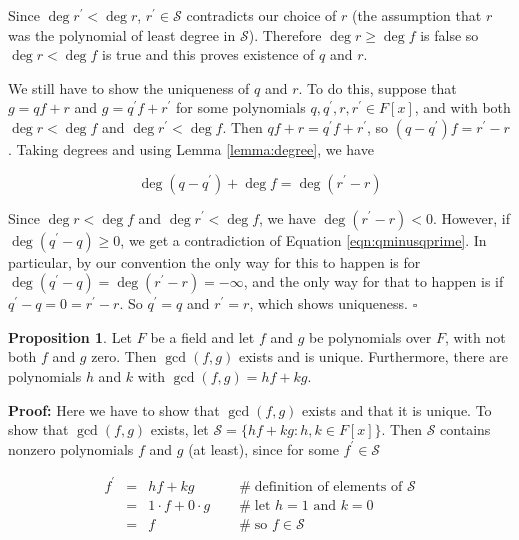 \documentclass[11pt, oneside]{article}   	%
\theoremstyle{definition}
\newtheorem{proposition}{Proposition}[section]
\begin{document}
\bigskip
\noindent
Since $\deg r^\prime < \deg r$,   $r^\prime \in \mathcal{S} $ contradicts our choice of $r$ (the assumption that $r$ was the polynomial of least degree
in $\mathcal{S}$).  Therefore $\deg r \geq \deg f$ is false so $\deg r  < \deg f$ is true and this proves existence of $q$ and $r$.

\bigskip
\noindent
We still have to show the uniqueness of $q$ and $r$. To do this, suppose that $g = qf +r$ and $g = q^{\prime} f + r^\prime$ for some polynomials 
$q,q^\prime, r,r^\prime \in F[x]$, and with both $\deg r < \deg f$ and $\deg r^\prime <  \deg f$. Then $qf +r = q^{\prime} f +r^{\prime}$, so 
$(q -  q^{\prime})f = r^\prime - r$. Taking degrees and using Lemma \ref{lemma:degree}, we have 

\begin{equation}
\deg (q - q^{\prime}) + \deg f  = \deg (r^\prime - r)
\label{eqn:qminusqprime}
\end{equation}

\bigskip
\noindent
Since $\deg r <  \deg f$ and $\deg r^\prime <  \deg f$, we have $\deg (r^\prime - r) < 0$. However, if $\deg(q^\prime - q) \geq 0$,  
we get a contradiction of Equation \ref{eqn:qminusqprime}. In particular, by our convention the only way for this to happen is for 
$\deg(q^\prime - q) = \deg(r^\prime - r) = - \infty$, and the only way for that to happen is if $q^\prime - q = 0 = r^\prime - r$. So $q^\prime = q$ and  
$r^\prime =r$, which shows uniqueness. $\square$

\bigskip
\begin{proposition}
Let $F$ be a field and let $f$ and $g$ be polynomials over $F$, with not both $f$ and $g$ zero. Then $\gcd(f, g)$ exists and is unique. 
Furthermore, there are polynomials $h$ and $k$ with $\gcd(f, g) = hf + kg$.
\end{proposition}

\noindent
\textbf{Proof:}  Here we have to show that $\gcd(f, g)$ exists and that it is unique. To show that $\gcd(f, g)$ exists, 
let $\mathcal{S} = \{hf + kg : h, k \in F [x]\}$. Then $\mathcal{S}$ contains nonzero polynomials $f$ and $g$ (at least), since
for some $f^\prime \in \mathcal{S}$

\begin{equation}
\begin{array}{rcll}
f^\prime
&=& hf +  kg                                            &\quad  \mathrel{\#} \text{definition of elements of } \mathcal{S}\\
&=& 1 \cdot f + 0 \cdot g                         &\quad  \mathrel{\#} \text{let $h = 1$ and $k = 0$}  \\
&=& f                                                       &\quad  \mathrel{\#} \text{so $f \in \mathcal{S}$}                    \\
\end{array}
\label{eqn:f}
\end{equation}
\end{document}
